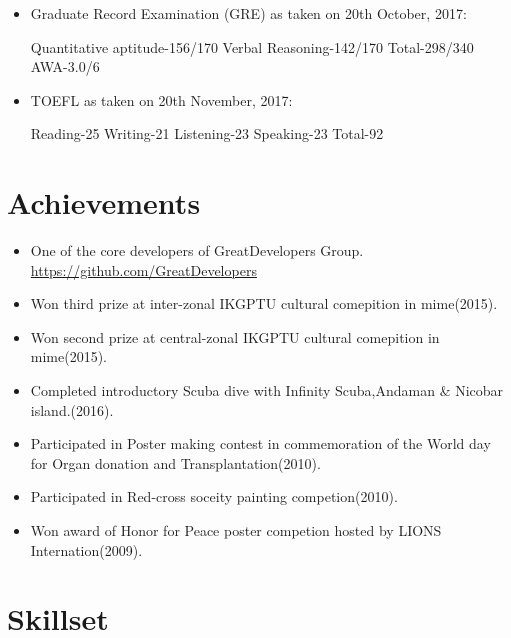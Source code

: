 \documentclass[10.1pt,a4paper,sans]{moderncv}        %
\begin{document}
\vspace{3pt}

\begin{itemize}

\item Graduate Record Examination (GRE) as taken on 20th October, 2017:

Quantitative aptitude-156/170 Verbal Reasoning-142/170 Total-298/340 AWA-3.0/6 

\item  TOEFL as taken on 20th November, 2017:

Reading-25 Writing-21 Listening-23 Speaking-23 Total-92


\end{itemize}

\section{Achievements}

\vspace{3pt}

\begin{itemize}

\item One of the core developers of GreatDevelopers Group. \href{https://github.com/orgs/GreatDevelopers/people}{https://github.com/GreatDevelopers}
\item Won third prize at inter-zonal IKGPTU cultural comepition in mime(2015). 
\item Won second prize at central-zonal IKGPTU cultural comepition in mime(2015).
\item Completed introductory Scuba dive with Infinity Scuba,Andaman & Nicobar island.(2016).
\item Participated in Poster making contest in commemoration of the World day for Organ donation and Transplantation(2010).
\item Participated in Red-cross soceity painting competion(2010).
\item Won award of Honor for Peace poster competion hosted by LIONS Internation(2009).


\end{itemize}

\section{Skillset}

\vspace{3pt}
 
\end{document}
